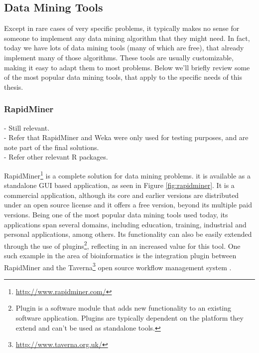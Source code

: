 
\subsection{Data Mining Tools}\label{sec:mintools}

Except in rare cases of very specific problems, it typically makes no sense for
someone to implement any data mining algorithm that they might need. In fact,
today we have lots of data mining tools (many of which are free), that already
implement many of those algorithms. These tools are usually customizable, making
it easy to adapt them to most problems. Below we'll briefly review some of the
most popular data mining tools, that apply to the specific needs of this thesis.

\subsubsection*{RapidMiner}

\begin{Notes}
- Still relevant.\\
- Refer that RapidMiner and Weka were only used for testing purposes, and are
note part of the final solutions.\\
- Refer other relevant R packages.\\
\end{Notes}

RapidMiner\footnote{\url{http://www.rapidminer.com/}} is a complete solution for
data mining problems. it is available as a standalone GUI based application, as
seen in Figure \ref{fig:rapidminer}. It is a commercial application, although
its core and earlier versions are distributed under an open source license and
it offers a free version, beyond its multiple paid versions. Being one of the
most popular data mining tools used today, its applications span several
domains, including education, training, industrial and personal applications,
among others. Its functionality can also be easily extended through the use of
plugins\footnote{Plugin is a software module that adds new functionality to an
existing software application. Plugins are typically dependent on the platform
they extend and can't be used as standalone tools.}, reflecting in an increased
value for this tool. One such example in the area of bioinformatics is the
integration plugin between RapidMiner and the
Taverna\footnote{\url{http://www.taverna.org.uk/}} open source workflow
management system \cite{Jupp2011}.

